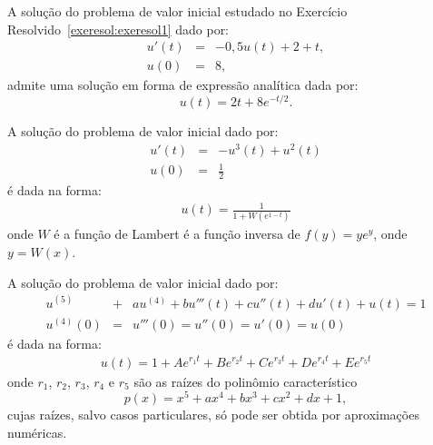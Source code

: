 \begin{ex} A solução do problema de valor inicial estudado no Exercício Resolvido~\ref{exeresol:exeresol1} dado por:
\begin{eqnarray}
     u'(t)&=& -0,5u(t)+2+t,\\
            u(0) &=&  8,
\end{eqnarray}
admite uma solução em forma de expressão analítica dada por:
\begin{equation}
     u(t) = 2t+8e^{-t/2}.
\end{equation}
\end{ex}

\begin{ex} A solução do problema de valor inicial dado por:
\begin{eqnarray}
u'(t)&=&-u^3(t)+u^2(t)\\
u(0)&=&\frac{1}{2}
\end{eqnarray}
é dada na forma:
\begin{eqnarray}
u(t)=\frac{1}{1+W(e^{1-t})}
\end{eqnarray}
onde $W$ é a função de Lambert é a função inversa de $f(y)=ye^y$, onde $y=W(x)$.
\end{ex}


\begin{ex} A solução do problema de valor inicial dado por:
\begin{eqnarray}
u^{(5)}&+&au^{(4)}+bu'''(t)+cu''(t)+du'(t)+u(t)=1\\
u^{(4)}(0)&=&u'''(0)=u''(0)=u'(0)=u(0)
\end{eqnarray}
é dada na forma:
\begin{eqnarray}
u(t)=1+Ae^{r_1 t} + Be^{r_2 t} + Ce^{r_3 t} + De^{r_4 t} + Ee^{r_5 t}
\end{eqnarray}
onde $r_1$, $r_2$, $r_3$, $r_4$ e $r_5$ são as raízes do polinômio característico \begin{equation} p(x)=x^5+ax^4+bx^3+cx^2+dx+1, \end{equation}
cujas raízes, salvo casos particulares, só pode ser obtida por aproximações numéricas.
 \end{ex}


